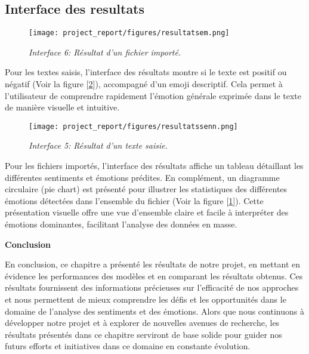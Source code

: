 \subsection{Interface des resultats}
\begin{figure}[h]
    \centering
    \texttt{[image: project\_report/figures/resultatsem.png]}
    \caption{\textit{Interface 6: Résultat d'un fichier importé.}}
    \label{fig:emmmm}
\end{figure}
Pour les textes saisis, l'interface des résultats montre si le texte est positif ou négatif (Voir la figure [\ref{fig:sennnn}]), accompagné d'un emoji descriptif. Cela permet à l'utilisateur de comprendre rapidement l'émotion générale exprimée dans le texte de manière visuelle et intuitive.
\begin{figure}[h]
    \centering
    \texttt{[image: project\_report/figures/resultatssenn.png]}
    \caption{\textit{Interface 5: Résultat d'un texte saisie.}}
    \label{fig:sennnn}
\end{figure}

Pour les fichiers importés, l'interface des résultats affiche un tableau détaillant les différentes sentiments et émotions prédites. En complément, un diagramme circulaire (pie chart) est présenté pour illustrer les statistiques des différentes émotions détectées dans l'ensemble du fichier (Voir la figure [\ref{fig:emmmm}]). Cette présentation visuelle offre une vue d'ensemble claire et facile à interpréter des émotions dominantes, facilitant l'analyse des données en masse.






\newpage


\textbf{Conclusion}\par
En conclusion, ce chapitre a présenté les résultats de notre projet, en mettant en évidence les performances des modèles et en comparant les résultats obtenus. Ces résultats fournissent des informations précieuses sur l'efficacité de nos approches et nous permettent de mieux comprendre les défis et les opportunités dans le domaine de l'analyse des sentiments et des émotions. Alors que nous continuons à développer notre projet et à explorer de nouvelles avenues de recherche, les résultats présentés dans ce chapitre serviront de base solide pour guider nos futurs efforts et initiatives dans ce domaine en constante évolution.




